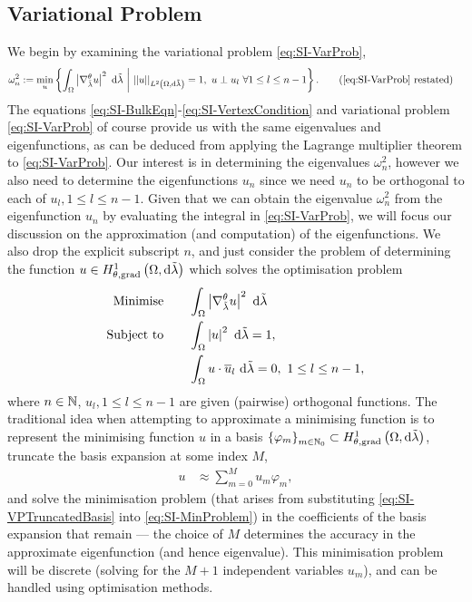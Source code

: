 \subsection{Variational Problem} \label{ssec:SI-VP}
We begin by examining the variational problem \eqref{eq:SI-VarProb},
\begin{align*} 
	\omega_n^2 &:= \min_{u}\clbracs{ \integral{\ddom}{ \abs{\tgrad_{\compMes}u}^2 }{\compMes} \setVert \norm{u}_{\ltwo{\ddom}{\compMes}}=1, \ u\perp u_l \ \forall 1\leq l\leq n-1 }. \tag{\eqref{eq:SI-VarProb} restated}
\end{align*}
The equations \eqref{eq:SI-BulkEqn}-\eqref{eq:SI-VertexCondition} and variational problem \eqref{eq:SI-VarProb} of course provide us with the same eigenvalues and eigenfunctions, as can be deduced from applying the Lagrange multiplier theorem to \eqref{eq:SI-VarProb}. 
Our interest is in determining the eigenvalues $\omega_n^2$, however we also need to determine the eigenfunctions $u_n$ since we need $u_n$ to be orthogonal to each of $u_l, 1\leq l\leq n-1$.
Given that we can obtain the eigenvalue $\omega_n^2$ from the eigenfunction $u_n$ by evaluating the integral in \eqref{eq:SI-VarProb}, we will focus our discussion on the approximation (and computation) of the eigenfunctions.
We also drop the explicit subscript $n$, and just consider the problem of determining the function $u\in H^1_{\theta, \mathrm{grad}}\left( \Omega, \mathrm{d}\tilde{\lambda} \right)$ which solves the optimisation problem
\begin{subequations} \label{eq:SI-MinProblem}
	\begin{align}
		\text{Minimise} \quad & \quad \int_{\Omega} \left\lvert \nabla^{\theta}_{\tilde{\lambda}}u \right\rvert^2  \ \mathrm{d}\tilde{\lambda} \\
		\text{Subject to} \quad & \quad \int_{\Omega} \left\lvert u \right\rvert^2  \ \mathrm{d}\tilde{\lambda} = 1, \\
		& \quad \int_{\Omega} u\cdot\overline{u}_l  \ \mathrm{d}\tilde{\lambda} = 0, \ 1\leq l\leq n-1,
	\end{align}
\end{subequations}
where $n\in\mathbb{N}$, $u_l, 1\leq l\leq n-1$ are given (pairwise) orthogonal functions.
The traditional idea when attempting to approximate a minimising function is to represent the minimising function $u$ in a basis $\left\{ \varphi_m \right\}_{m\in\mathbb{N}_0}\subset H^1_{\theta, \mathrm{grad}}\left( \Omega, \mathrm{d}\tilde{\lambda} \right)$, truncate the basis expansion at some index $M$,
\begin{align} \label{eq:SI-VPTruncatedBasis}
	u &\approx \sum_{m=0}^M u_m \varphi_m,
\end{align}
and solve the minimisation problem (that arises from substituting \eqref{eq:SI-VPTruncatedBasis} into \eqref{eq:SI-MinProblem}) in the coefficients of the basis expansion that remain --- the choice of $M$ determines the accuracy in the approximate eigenfunction (and hence eigenvalue).
This minimisation problem will be discrete (solving for the $M+1$ independent variables $u_m$), and can be handled using optimisation methods.

